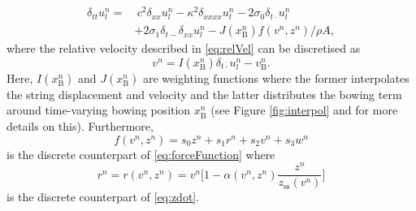    \begin{equation}
      \begin{aligned}
        \label{eq:FDS}
            \delta_{tt} u_l^n = &\: c^2 \delta_{xx} u_l^n -\kappa^2\delta_{xxxx} u_l^n - 2\sigma_0\delta_{t\cdot} u_l^n
            \\ 
            &+ 2\sigma_1\delta_{t-}\delta_{xx}u_l^n - J(x_\text{B}^n)f(v^n, z^n) / \rho A,
        \end{aligned}
    \end{equation}
    where the relative velocity described in \eqref{eq:relVel} can be discretised as
    \begin{equation}\label{eq:discRelVel}
    v^n = I(x_\text{B}^n)\delta_{t\cdot}u_l^n -  v_\text{B}^n.
    \end{equation}
        Here, $I(x_\text{B}^n)$ and $J(x_\text{B}^n)$ are weighting functions where the former interpolates the string displacement and velocity and the latter distributes the bowing term around time-varying bowing position $x_\text{B}^n$ (see Figure \ref{fig:interpol} and \cite{Bilbao2009}
    for more details on this). Furthermore,
    \begin{equation}\label{eq:discForceFunction}
        f(v^n,z^n) = s_0z^n + s_1r^n+s_2v^n+s_3w^n
    \end{equation} 
    is the discrete counterpart of \eqref{eq:forceFunction} where 
    \begin{equation}\label{eq:r}
        r^n = r(v^n,z^n) = v^n\bigg[1-\alpha(v^n,z^n)\frac{z^n}{z_\text{ss}(v^n)}\bigg]
    \end{equation}
    is the discrete counterpart of \eqref{eq:zdot}.
